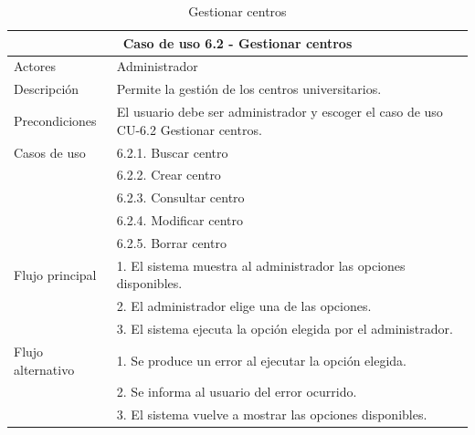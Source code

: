 \begin{table}[H]
    \caption{Gestionar centros}
    \label{tab:CU-6.2}
    \begin{center}
        \begin{tabular}{|l|p{12cm}|}
            \hline
            \multicolumn{2}{|c|}{Caso de uso 6.2 - Gestionar centros} \\ \hline \hline
            Actores                 &   Administrador\\  \hline
            Descripción             &   Permite la gestión de los centros universitarios. \\  \hline
            Precondiciones          &   El usuario debe ser administrador y escoger el caso de uso CU-6.2 Gestionar centros.          \\  \hline
            Casos de uso            & 6.2.1. Buscar centro  \\ 
            & 6.2.2. Crear centro \\ 
            & 6.2.3. Consultar centro \\ 
            & 6.2.4. Modificar centro \\ 
            & 6.2.5. Borrar centro \\ 
            \hline
            Flujo principal         &   1. El sistema muestra al administrador las opciones disponibles.   \\ 
            & 2. El administrador elige una de las opciones. \\ 
            & 3. El sistema ejecuta la opción elegida por el administrador. \\ 
            \hline
            Flujo alternativo    &   1. Se produce un error al ejecutar la opción elegida. \\ 
            & 2. Se informa al usuario del error ocurrido. \\ 
            & 3. El sistema vuelve a mostrar las opciones disponibles.  \\  
            \hline
        \end{tabular}
    \end{center}
\end{table}

